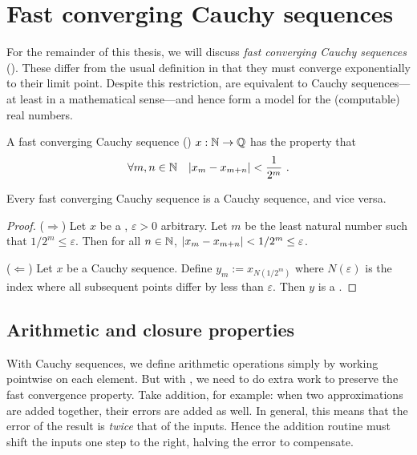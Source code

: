 \documentclass[leqno]{report}
\begin{document}
\chapter{Fast converging Cauchy sequences}

For the remainder of this thesis, we will discuss \textit{fast converging Cauchy sequences} (\FCCS). These differ from the usual definition in that they must converge exponentially to their limit point. Despite this restriction, \FCCS{} are equivalent to Cauchy sequences---at least in a mathematical sense---and hence form a model for the (computable) real numbers.

\begin{Definition}
    A fast converging Cauchy sequence (\FCCS) $x : \mathbb{N} \rightarrow \mathbb{Q}$ has the property that
    \[ \forall {m, n \in \mathbb{N}} \quad { \left| x_m - x_{m+n} \right| < \frac{1}{2^m} } \ . \]
\end{Definition}

\begin{Proposition}
    Every fast converging Cauchy sequence is a Cauchy sequence, and vice versa.
\end{Proposition}

\begin{proof}
    ($\Rightarrow$) Let $x$ be a \FCCS, $\varepsilon > 0$ arbitrary. Let $m$ be the least natural number such that $1/2^m \leq \varepsilon$. Then for all $n \in \mathbb{N}$, $\left| x_m - x_{m+n} \right| < 1/2^m \leq \varepsilon$.

    ($\Leftarrow$) Let $x$ be a Cauchy sequence. Define $y_m := x_{N(1/2^m)}$ where $N(\varepsilon)$ is the index where all subsequent points differ by less than $\varepsilon$. Then $y$ is a \FCCS.
\end{proof}

\section{Arithmetic and closure properties}

With Cauchy sequences, we define arithmetic operations simply by working pointwise on each element. But with \FCCS, we need to do extra work to preserve the fast convergence property. Take addition, for example: when two approximations are added together, their errors are added as well. In general, this means that the error of the result is \textit{twice} that of the inputs. Hence the addition routine must shift the inputs one step to the right, halving the error to compensate.
\end{document}
